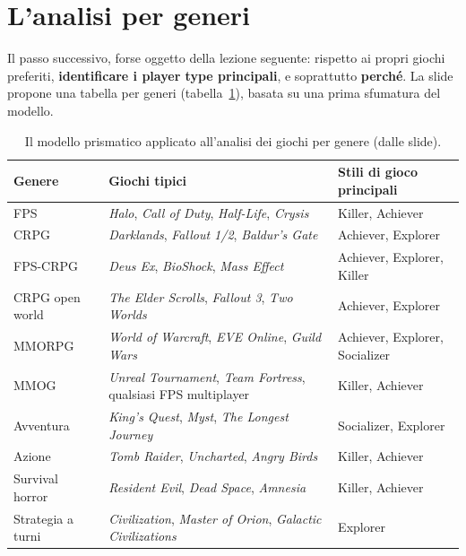 \section{L'analisi per generi}
\label{gd18:sec:generi}

Il passo successivo, forse oggetto della lezione seguente: rispetto ai propri giochi
preferiti, \textbf{identificare i player type principali}, e soprattutto
\textbf{perché}. La slide propone una tabella per generi
(tabella~\ref{gd18:tab:generi}), basata su una prima sfumatura del modello.

\begin{table}[ht]
\centering
\small
\begin{tabular}{@{}p{}p{}p{}@{}}
\toprule
\textbf{Genere} & \textbf{Giochi tipici} & \textbf{Stili di gioco principali} \\
\midrule
FPS & \emph{Halo}, \emph{Call of Duty}, \emph{Half-Life}, \emph{Crysis} & Killer,
Achiever \\
CRPG & \emph{Darklands}, \emph{Fallout 1/2}, \emph{Baldur's Gate} & Achiever,
Explorer \\
FPS-CRPG & \emph{Deus Ex}, \emph{BioShock}, \emph{Mass Effect} & Achiever,
Explorer, Killer \\
CRPG open world & \emph{The Elder Scrolls}, \emph{Fallout 3}, \emph{Two Worlds} &
Achiever, Explorer \\
MMORPG & \emph{World of Warcraft}, \emph{EVE Online}, \emph{Guild Wars} &
Achiever, Explorer, Socializer \\
MMOG & \emph{Unreal Tournament}, \emph{Team Fortress}, qualsiasi FPS multiplayer &
Killer, Achiever \\
Avventura & \emph{King's Quest}, \emph{Myst}, \emph{The Longest Journey} &
Socializer, Explorer \\
Azione & \emph{Tomb Raider}, \emph{Uncharted}, \emph{Angry Birds} & Killer,
Achiever \\
Survival horror & \emph{Resident Evil}, \emph{Dead Space}, \emph{Amnesia} & Killer,
Achiever \\
Strategia a turni & \emph{Civilization}, \emph{Master of Orion},
\emph{Galactic Civilizations} & Explorer \\
\bottomrule
\end{tabular}
\caption{Il modello prismatico applicato all'analisi dei giochi per genere (dalle
slide).}
\label{gd18:tab:generi}
\end{table}

